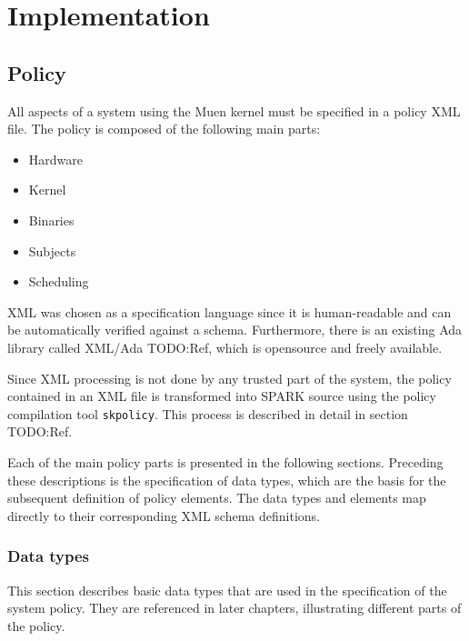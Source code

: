 \chapter{Implementation}

\section{Policy}
All aspects of a system using the Muen kernel must be specified in a policy XML
file. The policy is composed of the following main parts:

\begin{itemize}
	\item Hardware
	\item Kernel
	\item Binaries
	\item Subjects
	\item Scheduling
\end{itemize}

XML was chosen as a specification language since it is human-readable and can
be automatically verified against a schema. Furthermore, there is an existing
Ada library called XML/Ada TODO:Ref, which is opensource and freely available.

Since XML processing is not done by any trusted part of the system, the policy
contained in an XML file is transformed into SPARK source using the policy
compilation tool \texttt{skpolicy}. This process is described in detail in
section TODO:Ref.

Each of the main policy parts is presented in the following sections. Preceding
these descriptions is the specification of data types, which are the basis for
the subsequent definition of policy elements. The data types and elements map
directly to their corresponding XML schema definitions.

\subsection{Data types}
This section describes basic data types that are used in the specification of
the system policy. They are referenced in later chapters, illustrating different
parts of the policy.




